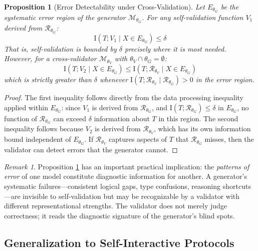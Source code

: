 \documentclass[11pt,a4paper]{article}
\newtheorem{proposition}{Proposition}[section]
\theoremstyle{remark}
\newtheorem{remark}{Remark}[section]
\newcommand{\MI}{\mathrm{I}}
\begin{document}
\begin{proposition}[Error Detectability under Cross-Validation]
\label{prop:error_detect}
Let $E_{\theta_G}$ be the systematic error region of the generator $\mathcal{M}_{\theta_G}$. For any self-validation function $V_1$ derived from $\mathcal{R}_{\theta_G}$:
\begin{equation}
  \MI(T; V_1 \mid X \in E_{\theta_G}) \leq \delta
\end{equation}
That is, self-validation is bounded by $\delta$ precisely where it is most needed. However, for a cross-validator $\mathcal{M}_{\theta_V}$ with $\theta_V \cap \theta_G = \emptyset$:
\begin{equation}
  \MI(T; V_2 \mid X \in E_{\theta_G}) \leq \MI(T; \mathcal{R}_{\theta_V} \mid X \in E_{\theta_G})
\end{equation}
which is strictly greater than $\delta$ whenever $\MI(T; \mathcal{R}_{\theta_V} \mid \mathcal{R}_{\theta_G}) > 0$ in the error region.
\end{proposition}

\begin{proof}
The first inequality follows directly from the data processing inequality applied within $E_{\theta_G}$: since $V_1$ is derived from $\mathcal{R}_{\theta_G}$, and $\MI(T; \mathcal{R}_{\theta_G}) \leq \delta$ in $E_{\theta_G}$, no function of $\mathcal{R}_{\theta_G}$ can exceed $\delta$ information about $T$ in this region. The second inequality follows because $V_2$ is derived from $\mathcal{R}_{\theta_V}$, which has its own information bound independent of $E_{\theta_G}$. If $\mathcal{R}_{\theta_V}$ captures aspects of $T$ that $\mathcal{R}_{\theta_G}$ misses, then the validator can detect errors that the generator cannot.
\end{proof}

\begin{remark}
\label{rem:error_patterns}
Proposition \ref{prop:error_detect} has an important practical implication: the \emph{patterns of error} of one model constitute diagnostic information for another. A generator's systematic failures---consistent logical gaps, type confusions, reasoning shortcuts---are invisible to self-validation but may be recognizable by a validator with different representational strengths. The validator does not merely judge correctness; it reads the diagnostic signature of the generator's blind spots.
\end{remark}

\subsection{Generalization to Self-Interactive Protocols}
\end{document}
